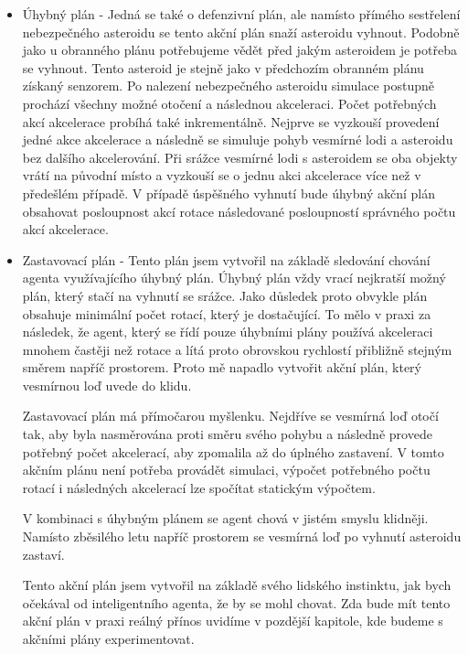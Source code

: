 \begin{itemize}
    
    \item Úhybný plán - Jedná se také o defenzivní plán, ale namísto přímého sestřelení nebezpečného asteroidu se tento akční plán snaží asteroidu vyhnout.
    Podobně jako u obranného plánu potřebujeme vědět před jakým asteroidem je potřeba se vyhnout. Tento asteroid je stejně jako v předchozím obranném plánu získaný senzorem. Po nalezení nebezpečného asteroidu simulace postupně prochází všechny možné otočení a následnou akceleraci.
    Počet potřebných akcí akcelerace probíhá také inkrementálně. Nejprve se vyzkouší provedení jedné akce akcelerace a následně se simuluje pohyb vesmírné lodi a asteroidu bez dalšího akcelerování.
    Při srážce vesmírné lodi s asteroidem se oba objekty vrátí na původní místo a vyzkouší se o jednu akci akcelerace více než v předešlém případě.
    V případě úspěšného vyhnutí bude úhybný akční plán obsahovat posloupnost akcí rotace následované posloupností správného počtu akcí akcelerace.
    
    \item Zastavovací plán - Tento plán jsem vytvořil na základě sledování chování agenta využívajícího úhybný plán. Úhybný plán vždy vrací nejkratší možný plán, který stačí na vyhnutí se srážce. Jako důsledek proto obvykle plán obsahuje minimální počet rotací, který je dostačující.
        To mělo v praxi za následek, že agent, který se řídí pouze úhybními plány používá akceleraci mnohem častěji než rotace a lítá proto obrovskou rychlostí přibližně stejným směrem napříč prostorem. Proto mě napadlo vytvořit akční plán, který vesmírnou loď uvede do klidu.
        \par
        Zastavovací plán má přímočarou myšlenku. 
        Nejdříve se vesmírná loď otočí tak, aby byla nasměrována proti směru svého pohybu a následně provede potřebný počet akcelerací, aby zpomalila až do úplného zastavení. 
        V tomto akčním plánu není potřeba provádět simulaci, výpočet potřebného počtu rotací i následných akcelerací lze spočítat statickým výpočtem.
        
        \par
        V kombinaci s úhybným plánem se agent chová v jistém smyslu klidněji.
        Namísto zběsilého letu napříč prostorem se vesmírná loď po vyhnutí asteroidu zastaví.            
        \par
        Tento akční plán jsem vytvořil na základě svého lidského instinktu, jak bych očekával od inteligentního agenta, že by se mohl chovat. Zda bude mít tento akční plán v praxi reálný přínos uvidíme v pozdější kapitole, kde budeme s akčními plány experimentovat.
        
        
\end{itemize}


